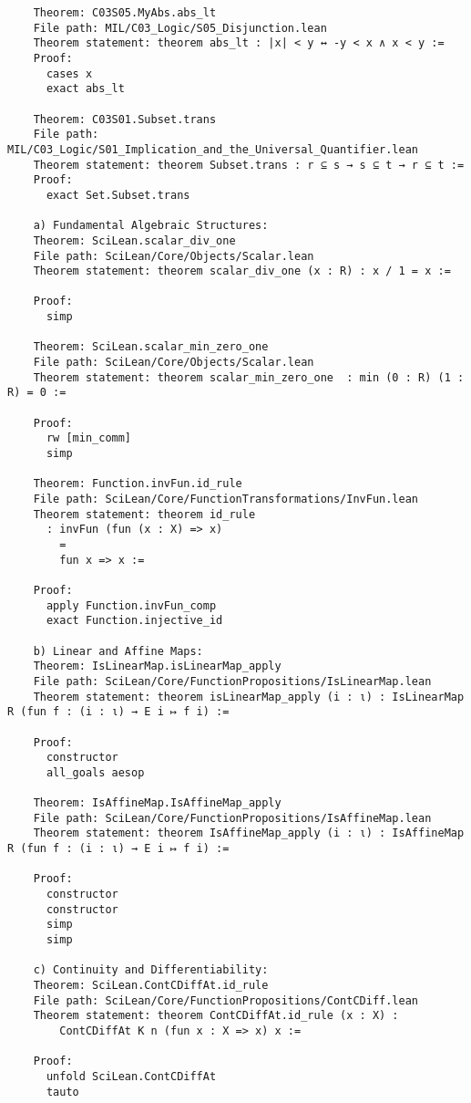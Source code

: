 \documentclass{article} %
\begin{document}
\begin{verbatim}
    Theorem: C03S05.MyAbs.abs_lt
    File path: MIL/C03_Logic/S05_Disjunction.lean
    Theorem statement: theorem abs_lt : |x| < y ↔ -y < x ∧ x < y :=
    Proof:
      cases x
      exact abs_lt

    Theorem: C03S01.Subset.trans
    File path: MIL/C03_Logic/S01_Implication_and_the_Universal_Quantifier.lean
    Theorem statement: theorem Subset.trans : r ⊆ s → s ⊆ t → r ⊆ t :=
    Proof:
      exact Set.Subset.trans

    a) Fundamental Algebraic Structures:
    Theorem: SciLean.scalar_div_one
    File path: SciLean/Core/Objects/Scalar.lean
    Theorem statement: theorem scalar_div_one (x : R) : x / 1 = x :=
    
    Proof:
      simp
    
    Theorem: SciLean.scalar_min_zero_one
    File path: SciLean/Core/Objects/Scalar.lean
    Theorem statement: theorem scalar_min_zero_one  : min (0 : R) (1 : R) = 0 :=
    
    Proof:
      rw [min_comm]
      simp
    
    Theorem: Function.invFun.id_rule
    File path: SciLean/Core/FunctionTransformations/InvFun.lean
    Theorem statement: theorem id_rule
      : invFun (fun (x : X) => x)
        =
        fun x => x :=
    
    Proof:
      apply Function.invFun_comp
      exact Function.injective_id

    b) Linear and Affine Maps:
    Theorem: IsLinearMap.isLinearMap_apply
    File path: SciLean/Core/FunctionPropositions/IsLinearMap.lean
    Theorem statement: theorem isLinearMap_apply (i : ι) : IsLinearMap R (fun f : (i : ι) → E i ↦ f i) :=
    
    Proof:
      constructor
      all_goals aesop
    
    Theorem: IsAffineMap.IsAffineMap_apply
    File path: SciLean/Core/FunctionPropositions/IsAffineMap.lean
    Theorem statement: theorem IsAffineMap_apply (i : ι) : IsAffineMap R (fun f : (i : ι) → E i ↦ f i) :=
    
    Proof:
      constructor
      constructor
      simp
      simp

    c) Continuity and Differentiability:
    Theorem: SciLean.ContCDiffAt.id_rule
    File path: SciLean/Core/FunctionPropositions/ContCDiff.lean
    Theorem statement: theorem ContCDiffAt.id_rule (x : X) :
        ContCDiffAt K n (fun x : X => x) x :=
    
    Proof:
      unfold SciLean.ContCDiffAt
      tauto
    

\end{verbatim}
\end{document}

